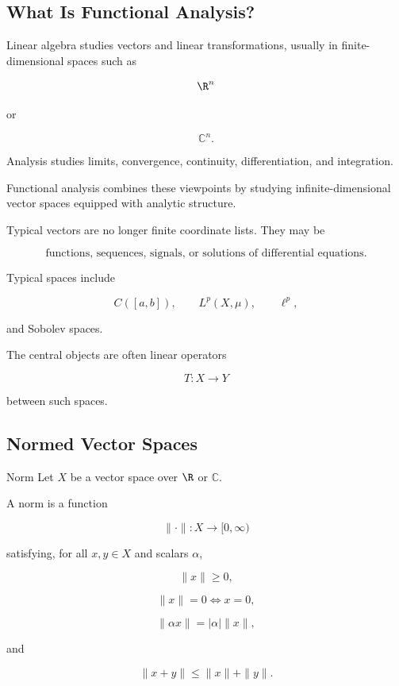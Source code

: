 \subsection{What Is Functional Analysis?}
\label{subsec:what-is-functional-analysis}

Linear algebra studies vectors and linear transformations, usually in
finite-dimensional spaces such as

\[
\R^n
\]

or

\[
\mathbb{C}^n.
\]

Analysis studies limits, convergence, continuity, differentiation, and
integration.

Functional analysis combines these viewpoints by studying
infinite-dimensional vector spaces equipped with analytic structure.

Typical vectors are no longer finite coordinate lists. They may be

\[
\boxed{
\text{functions, sequences, signals, or solutions of differential equations}.
}
\]

Typical spaces include

\[
C([a,b]),
\qquad
L^p(X,\mu),
\qquad
\ell^p,
\]

and Sobolev spaces.

The central objects are often linear operators

\[
\boxed{
T:X\to Y
}
\]

between such spaces.

\subsection{Normed Vector Spaces}
\label{subsec:normed-vector-spaces}

\begin{definitionbox}{Norm}
Let \(X\) be a vector space over \(\R\) or \(\mathbb{C}\).

A norm is a function

\[
\|\cdot\|:X\to[0,\infty)
\]

satisfying, for all \(x,y\in X\) and scalars \(\alpha\),

\[
\boxed{
\|x\|\geq0,
}
\]

\[
\boxed{
\|x\|=0
\iff
x=0,
}
\]

\[
\boxed{
\|\alpha x\|
=
|\alpha|\|x\|,
}
\]

and

\[
\boxed{
\|x+y\|
\leq
\|x\|+\|y\|.
}
\]
\end{definitionbox}

